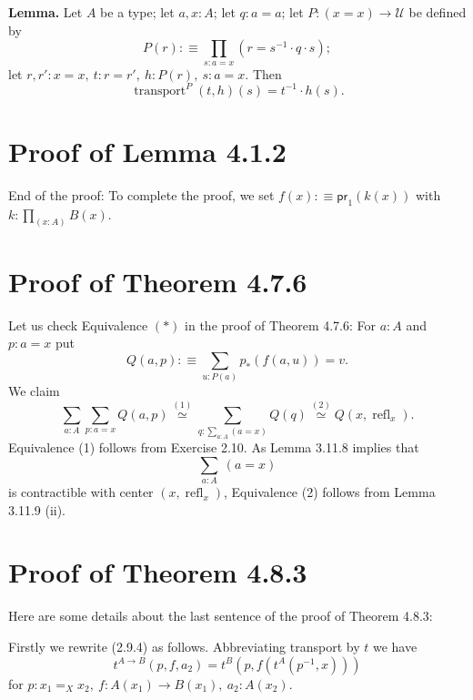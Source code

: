 \documentclass[12pt]{article}
\newcommand{\msf}{\mathsf}
\newcommand{\ee}{\equiv}
\newcommand{\two}{\mathbf2}
\newcommand{\nn}{\noindent}
\newcommand{\oo}{\operatorname}
\newcommand{\U}{\mathcal U}
\begin{document}
\nn \textbf{Lemma.} Let $A$ be a type; let $a,x:A$; let $q:a=a$; let $P:(x=x)\to\U$ be defined by 
$$
P(r):\equiv\prod_{s:a=x}(r=s^{-1}\cdot q\cdot s);
$$ 
let $r,r':x=x,\ t:r=r',\ h:P(r),\ s:a=x$. Then 
$$
\oo{transport}^P(t,h)(s)=t^{-1}\cdot h(s).
$$ 


\section{Proof of Lemma 4.1.2}

End of the proof: To complete the proof, we set $f(x):\ee\msf{pr}_1(k(x))$ with $k:\prod_{(x:A)}B(x)$.





\section{Proof of Theorem 4.7.6}

Let us check Equivalence $(*)$ in the proof of Theorem 4.7.6: For $a:A$ and $p:a=x$ put 
$$
Q(a,p):\equiv\sum_{u:P(a)}p_*(f(a,u))=v.
$$ 
We claim 
$$
\sum_{a:A}\sum_{p:a=x}Q(a,p)\overset{(1)}{\simeq}
\sum_{q:\sum_{a:A}(a=x)}Q(q)\overset{(2)}{\simeq}
Q(x,\oo{refl}_x).
$$
Equivalence (1) follows from Exercise 2.10. As Lemma 3.11.8 implies that $$\sum_{a:A}\ (a=x)$$ is contractible with center $(x,\oo{refl}_x)$, Equivalence (2) follows from Lemma 3.11.9 (ii). 


\section{Proof of Theorem 4.8.3}

Here are some details about the last sentence of the proof of Theorem 4.8.3:

Firstly we rewrite (2.9.4) as follows. Abbreviating transport by $t$ we have 
\begin{equation}\label{2.9.4}
t^{A\to B}(p,f,a_2)=t^B(p,f(t^A(p^{-1},x)))
\end{equation}
for $p:x_1=_Xx_2,\ f:A(x_1)\to B(x_1),\ a_2:A(x_2)$. 
\end{document}
